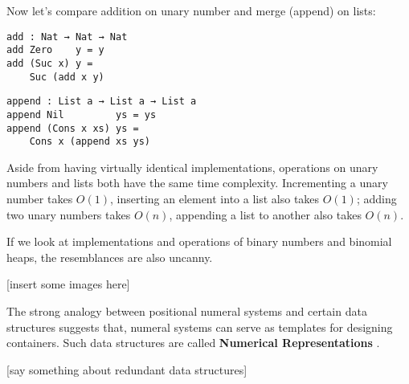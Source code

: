 \documentclass[../thesis.tex]{subfiles}
\begin{document}
Now let's compare addition on unary number and merge (append) on lists:

\noindent\begin{minipage}{.48\textwidth}
\begin{lstlisting}[basicstyle=\ttfamily\scriptsize]
add : Nat → Nat → Nat
add Zero    y = y
add (Suc x) y =
    Suc (add x y)
\end{lstlisting}
\end{minipage}\hfill
\begin{minipage}{.45\textwidth}
\begin{lstlisting}[basicstyle=\ttfamily\scriptsize]
append : List a → List a → List a
append Nil         ys = ys
append (Cons x xs) ys =
    Cons x (append xs ys)
\end{lstlisting}
\end{minipage}

Aside from having virtually identical implementations, operations on unary numbers
and lists both have the same time complexity. Incrementing a unary number takes
$ O(1) $, inserting an element into a list also takes $ O(1) $; adding two unary
numbers takes $ O(n) $, appending a list to another also takes $ O(n) $.

If we look at implementations and operations of binary numbers and binomial
heaps, the resemblances are also uncanny.

[insert some images here]

The strong analogy between positional numeral systems and certain data structures
suggests that, numeral systems can serve as templates for designing containers.
Such data structures are called \textbf{Numerical Representations}\cite{okasaki1996purely}
\cite{hinze1998numerical}.

[say something about redundant data structures]



\end{document}
